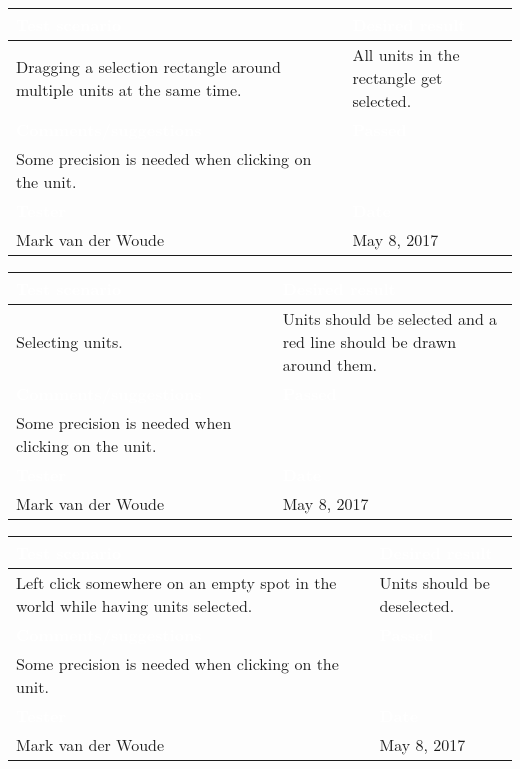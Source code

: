 \begin{tabularx}{\textwidth}{|X|X|}
\hline
\rowcolor{lightgray}\textcolor{white}{\textbf{Test scenario}} &
\textcolor{white}{\textbf{Desired result}}       
\\\hline
Dragging a selection rectangle around multiple units at the same time. & All units in the rectangle get selected.   
\\\hline
\rowcolor{lightgray}\textcolor{white}{\textbf{Comments/suggestions}} & 
\textcolor{white}{\textbf{Passed}}
\\\hline
Some precision is needed when clicking on the unit. & \cellcolor{green}                      
\\\hline
\rowcolor{lightgray}\textcolor{white}{\textbf{Tester}} & \cellcolor{lightgray}\textcolor{white}{\textbf{Date}}               
\\\hline
Mark van der Woude & May 8, 2017                               		 
\\\hline
\end{tabularx}


\begin{tabularx}{\textwidth}{|X|X|}
\hline
\rowcolor{lightgray}\textcolor{white}{\textbf{Test scenario}} &
\textcolor{white}{\textbf{Desired result}}       
\\\hline
Selecting units. & Units should be selected and a red line should be drawn around them.  
\\\hline
\rowcolor{lightgray}\textcolor{white}{\textbf{Comments/suggestions}} & 
\textcolor{white}{\textbf{Passed}}
\\\hline
Some precision is needed when clicking on the unit. & \cellcolor{green}                      
\\\hline
\rowcolor{lightgray}\textcolor{white}{\textbf{Tester}} & \cellcolor{lightgray}\textcolor{white}{\textbf{Date}}               
\\\hline
Mark van der Woude & May 8, 2017                               		 
\\\hline
\end{tabularx}


\begin{tabularx}{\textwidth}{|X|X|}
\hline
\rowcolor{lightgray}\textcolor{white}{\textbf{Test scenario}} &
\textcolor{white}{\textbf{Desired result}}       
\\\hline
Left click somewhere on an empty spot in the world while having units selected. & Units should be deselected.  
\\\hline
\rowcolor{lightgray}\textcolor{white}{\textbf{Comments/suggestions}} & 
\textcolor{white}{\textbf{Passed}}
\\\hline
Some precision is needed when clicking on the unit. & \cellcolor{green}                      
\\\hline
\rowcolor{lightgray}\textcolor{white}{\textbf{Tester}} & \cellcolor{lightgray}\textcolor{white}{\textbf{Date}}               
\\\hline
Mark van der Woude & May 8, 2017                               		 
\\\hline
\end{tabularx}


